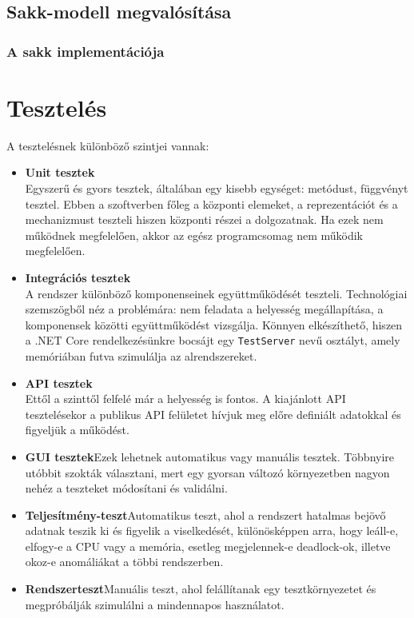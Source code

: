 \documentclass[twoside, a4paper, 12pt]{article}
\begin{document}
\subsection{Sakk-modell megvalósítása}


\subsubsection{A sakk implementációja}






\newpage
\section{Tesztelés}
A tesztelésnek különböző szintjei vannak:
\begin{itemize}
	\item \textbf{Unit tesztek} \\
	Egyszerű és gyors tesztek, általában egy kisebb egységet: metódust, függvényt tesztel. Ebben a szoftverben főleg a központi elemeket, a reprezentációt és a mechanizmust teszteli hiszen központi részei a dolgozatnak. Ha ezek nem működnek megfelelően, akkor az egész programcsomag nem működik megfelelően.
	
	\item \textbf{Integrációs tesztek} \\
	A rendszer különböző komponenseinek együttműködését teszteli. Technológiai szemszögből néz a problémára: nem feladata a helyesség megállapítása, a komponensek közötti együttműködést vizsgálja. Könnyen elkészíthető, hiszen a .NET Core rendelkezésünkre bocsájt egy \texttt{TestServer} nevű osztályt, amely memóriában futva szimulálja az alrendszereket.
	
	\item \textbf{API tesztek} \\
	Ettől a szinttől felfelé már a helyesség is fontos. A kiajánlott API tesztelésekor a publikus API felületet hívjuk meg előre definiált adatokkal és figyeljük a működést.
	
	\item \textbf{GUI tesztek}Ezek lehetnek automatikus vagy manuális tesztek. Többnyire utóbbit szokták választani, mert egy gyorsan változó környezetben nagyon nehéz a teszteket módosítani és validálni.
	
	\item \textbf{Teljesítmény-teszt}Automatikus teszt, ahol a rendszert hatalmas bejövő adatnak teszik ki és figyelik a viselkedését, különösképpen arra, hogy leáll-e, elfogy-e a CPU vagy a memória, esetleg megjelennek-e deadlock-ok, illetve okoz-e anomáliákat a többi rendszerben.
	
	\item \textbf{Rendszerteszt}Manuális teszt, ahol felállítanak egy tesztkörnyezetet és megpróbálják szimulálni a mindennapos használatot.
	
\end{itemize}
\end{document}
